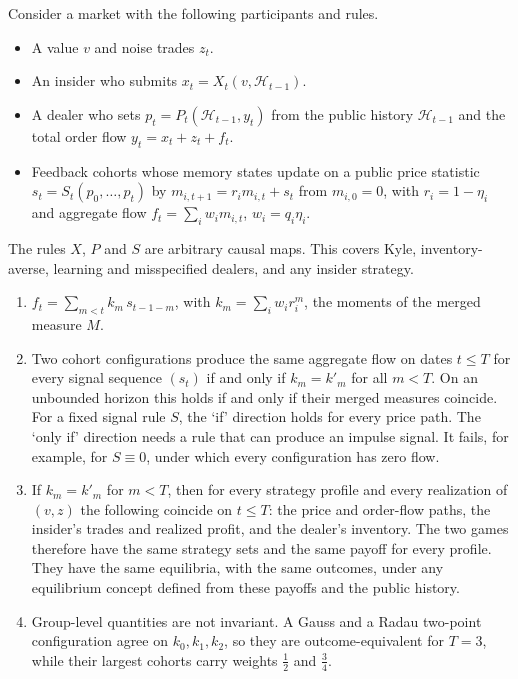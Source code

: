 \begin{theorem}\label{thm:eqinv}
Consider a market with the following participants and rules.
\begin{itemize}[itemsep=1pt,topsep=2pt]
\item A value $v$ and noise trades $z_t$.
\item An insider who submits $x_t=X_t(v,\mathcal H_{t-1})$.
\item A dealer who sets $p_t=P_t(\mathcal H_{t-1},y_t)$ from the public history $\mathcal H_{t-1}$ and the total order flow $y_t=x_t+z_t+f_t$.
\item Feedback cohorts whose memory states update on a public price statistic $s_t=S_t(p_0,\ldots,p_t)$ by $m_{i,t+1}=r_im_{i,t}+s_t$ from $m_{i,0}=0$, with $r_i=1-\eta_i$ and aggregate flow $f_t=\sum_iw_im_{i,t}$, $w_i=q_i\eta_i$.
\end{itemize}
The rules $X$, $P$ and $S$ are arbitrary causal maps. This covers Kyle, inventory-averse, learning and misspecified dealers, and any insider strategy.
\begin{enumerate}[label=(\roman*),itemsep=1pt]
\item $f_t=\sum_{m<t}k_m\,s_{t-1-m}$, with $k_m=\sum_iw_ir_i^m$, the moments of the merged measure $M$.
\item Two cohort configurations produce the same aggregate flow on dates $t\le T$ for every signal sequence $(s_t)$ if and only if $k_m=k'_m$ for all $m<T$. On an unbounded horizon this holds if and only if their merged measures coincide. For a fixed signal rule $S$, the `if' direction holds for every price path. The `only if' direction needs a rule that can produce an impulse signal. It fails, for example, for $S\equiv0$, under which every configuration has zero flow.
\item If $k_m=k'_m$ for $m<T$, then for every strategy profile and every realization of $(v,z)$ the following coincide on $t\le T$: the price and order-flow paths, the insider's trades and realized profit, and the dealer's inventory. The two games therefore have the same strategy sets and the same payoff for every profile. They have the same equilibria, with the same outcomes, under any equilibrium concept defined from these payoffs and the public history.
\item Group-level quantities are not invariant. A Gauss and a Radau two-point configuration agree on $k_0,k_1,k_2$, so they are outcome-equivalent for $T=3$, while their largest cohorts carry weights $\tfrac12$ and $\tfrac34$.
\end{enumerate}
\end{theorem}

